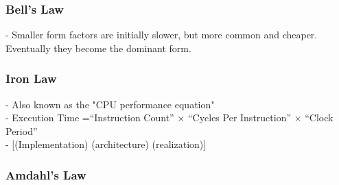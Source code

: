 \documentclass[12pt]{article}
\begin{document}
            \subsubsection{Bell’s Law}
                - Smaller form factors are initially slower, but more common and cheaper. Eventually they become the dominant form.
            \subsubsection{Iron Law}
                - Also known as the "CPU performance equation"\\
                - Execution Time =“Instruction Count” × “Cycles Per Instruction” × “Clock Period”\\
                - [(Implementation) (architecture) (realization)]
            \subsubsection{Amdahl’s Law}
\end{document}
